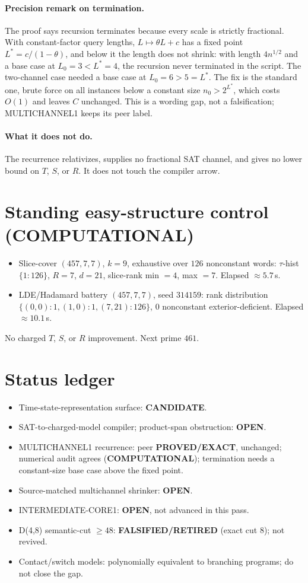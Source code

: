 \documentclass[11pt]{article}
\begin{document}
\paragraph{Precision remark on termination.} The proof says recursion terminates because every scale is strictly fractional. With constant-factor query lengths, $L\mapsto\theta L+c$ has a fixed point $L^*=c/(1-\theta)$, and below it the length does not shrink: with length $4n^{1/2}$ and a base case at $L_0=3<L^*=4$, the recursion never terminated in the script. The two-channel case needed a base case at $L_0=6>5=L^*$. The fix is the standard one, brute force on all instances below a constant size $n_0>2^{L^*}$, which costs $O(1)$ and leaves $C$ unchanged. This is a wording gap, not a falsification; MULTICHANNEL1 keeps its peer label.

\paragraph{What it does not do.} The recurrence relativizes, supplies no fractional SAT channel, and gives no lower bound on $T$, $S$, or $R$. It does not touch the compiler arrow.

\section*{Standing easy-structure control (COMPUTATIONAL)}
\begin{itemize}
\item Slice-cover $(457,7,7)$, $k=9$, exhaustive over $126$ nonconstant words: $\tau$-hist $\{1{:}126\}$, $R=7$, $d=21$, slice-rank min $=4$, max $=7$. Elapsed $\approx5.7$\,s.
\item LDE/Hadamard battery $(457,7,7)$, seed $314159$: rank distribution $\{(0,0){:}1,(1,0){:}1,(7,21){:}126\}$, $0$ nonconstant exterior-deficient. Elapsed $\approx10.1$\,s.
\end{itemize}
No charged $T$, $S$, or $R$ improvement. Next prime $461$.

\section*{Status ledger}
\begin{itemize}
\item Time-state-representation surface: \textbf{CANDIDATE}.
\item SAT-to-charged-model compiler; product-span obstruction: \textbf{OPEN}.
\item MULTICHANNEL1 recurrence: peer \textbf{PROVED/EXACT}, unchanged; numerical audit agrees (\textbf{COMPUTATIONAL}); termination needs a constant-size base case above the fixed point.
\item Source-matched multichannel shrinker: \textbf{OPEN}.
\item INTERMEDIATE-CORE1: \textbf{OPEN}, not advanced in this pass.
\item D(4,8) semantic-cut $\ge48$: \textbf{FALSIFIED/RETIRED} (exact cut 8); not revived.
\item Contact/switch models: polynomially equivalent to branching programs; do not close the gap.
\end{itemize}
\end{document}
